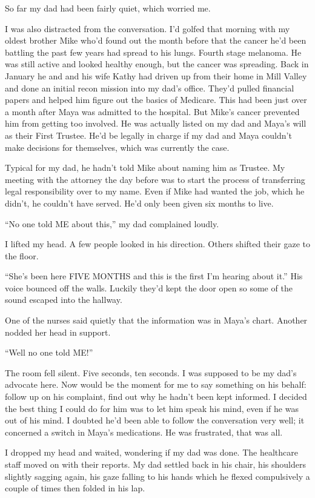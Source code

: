 \documentclass[12pt]{book}
\begin{document}
So far my dad had been fairly quiet, which worried me.

I was also distracted from the conversation. I'd golfed that morning with my oldest brother Mike who'd found out the month before that the cancer he'd been battling the past few years had spread to his lungs. Fourth stage melanoma. He was still active and looked healthy enough, but the cancer was spreading. Back in January he and and his wife Kathy had driven up from their home in Mill Valley and done an initial recon mission into my dad's office. They'd pulled financial papers and helped him figure out the basics of Medicare. This had been just over a month after Maya was admitted to the hospital. But Mike's cancer prevented him from getting too involved. He was actually listed on my dad and Maya's will as their First Trustee. He'd be legally in charge if my dad and Maya couldn't make decisions for themselves, which was currently the case.

Typical for my dad, he hadn't told Mike about naming him as Trustee. My meeting with the attorney the day before was to start the process of transferring legal responsibility over to my name. Even if Mike had wanted the job, which he didn't, he couldn't have served. He'd only been given six months to live.

``No one told ME about this,'' my dad complained loudly.

I lifted my head. A few people looked in his direction. Others shifted their gaze to the floor.

``She's been here FIVE MONTHS and this is the first I'm hearing about it.'' His voice bounced off the walls. Luckily they'd kept the door open so some of the sound escaped into the hallway.

One of the nurses said quietly that the information was in Maya's chart. Another nodded her head in support.

``Well no one told ME!''

The room fell silent. Five seconds, ten seconds. I was supposed to be my dad's advocate here. Now would be the moment for me to say something on his behalf: follow up on his complaint, find out why he hadn't been kept informed. I decided the best thing I could do for him was to let him speak his mind, even if he was out of his mind. I doubted he'd been able to follow the conversation very well; it concerned a switch in Maya's medications. He was frustrated, that was all.

I dropped my head and waited, wondering if my dad was done. The healthcare staff moved on with their reports. My dad settled back in his chair, his shoulders slightly sagging again, his gaze falling to his hands which he flexed compulsively a couple of times then folded in his lap.
\end{document}
